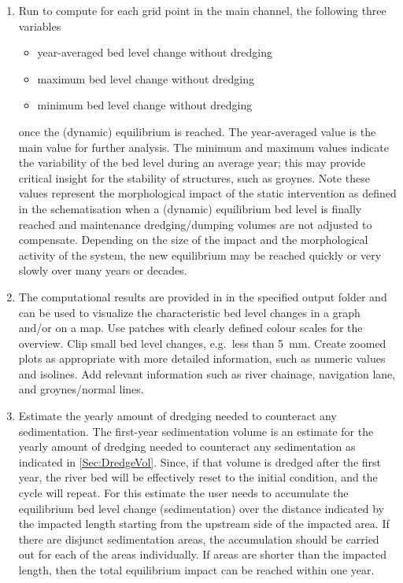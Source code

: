\begin{enumerate}
\item Run \dfastmi to compute for each grid point in the main channel, the following three variables

\begin{itemize}
\item year-averaged bed level change  without dredging
\item maximum bed level change  without dredging
\item minimum bed level change  without dredging
\end{itemize}

once the (dynamic) equilibrium is reached. The year-averaged value is the main value for further analysis.
The minimum and maximum values indicate the variability of the bed level during an average year; this may provide critical insight for the stability of structures, such as groynes.
Note these values represent the morphological impact of the static intervention as defined in the \dflowfm schematisation when a (dynamic) equilibrium bed level is finally reached and maintenance dredging/dumping volumes are not adjusted to compensate.
Depending on the size of the impact and the morphological activity of the system, the new equilibrium may be reached quickly or very slowly over many years or decades.

\item The computational results are provided in  in the specified output folder and can be used to visualize the characteristic bed level changes in a graph and/or on a map.
Use patches with clearly defined colour scales for the overview.
Clip small bed level changes, e.g.~less than \SI{5}{\milli\metre}.
Create zoomed plots as appropriate with more detailed information, such as numeric values and isolines.
Add relevant information such as river chainage, navigation lane, and groynes/normal lines.

\item Estimate the yearly amount of dredging needed to counteract any sedimentation.
The first-year sedimentation volume is an estimate for the yearly amount of dredging needed to counteract any sedimentation as indicated in \autoref{Sec:DredgeVol}.
Since, if that volume is dredged after the first year, the river bed will be effectively reset to the initial condition, and the cycle will repeat.
For this estimate the user needs to accumulate the equilibrium bed level change (sedimentation) over the distance indicated by the impacted length starting from the upstream side of the impacted area.
If there are disjunct sedimentation areas, the accumulation should be carried out for each of the areas individually.
If areas are shorter than the impacted length, then the total equilibrium impact can be reached within one year.
\end{enumerate}
